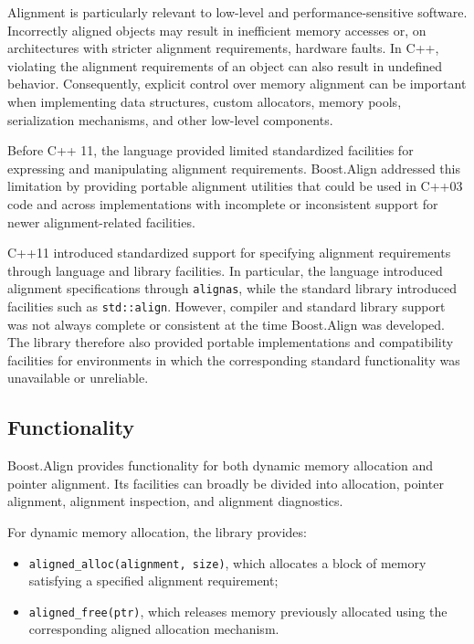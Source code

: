 Alignment is particularly relevant to low-level and performance-sensitive software. 
Incorrectly aligned objects may result in inefficient memory accesses or, on architectures with stricter alignment requirements, hardware faults.
In C++, violating the alignment requirements of an object can also result in undefined behavior. 
Consequently, explicit control over memory alignment can be important when implementing data structures, 
custom allocators, memory pools, serialization mechanisms, and other low-level components.

Before C++ 11, the language provided limited standardized facilities for expressing and manipulating alignment requirements.
Boost.Align addressed this limitation by providing portable alignment utilities that could be used in C++03 code and 
across implementations with incomplete or inconsistent support for newer alignment-related facilities.

C++11 introduced standardized support for specifying alignment requirements through language and library facilities. 
In particular, the language introduced alignment specifications through \texttt{alignas}, 
while the standard library introduced facilities such as \texttt{std::align}. 
However, compiler and standard library support was not always complete or consistent at the time Boost.Align was developed. 
The library therefore also provided portable implementations and compatibility facilities for environments in which 
the corresponding standard functionality was unavailable or unreliable.

\subsection{Functionality}

Boost.Align provides functionality for both dynamic memory allocation and pointer alignment.
Its facilities can broadly be divided into allocation, pointer alignment, alignment inspection, and alignment diagnostics.

For dynamic memory allocation, the library provides:

\begin{itemize}
\item \texttt{aligned\_alloc(alignment, size)}, which allocates a block of memory satisfying a specified alignment requirement;
\item \texttt{aligned\_free(ptr)}, which releases memory previously allocated using the corresponding aligned allocation mechanism.
\end{itemize}

